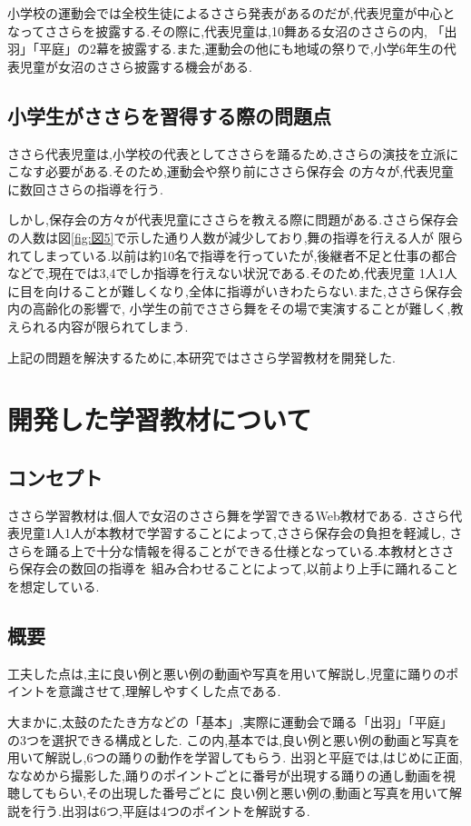 \documentclass[12pt]{ltjsarticle}
\begin{document}
小学校の運動会では全校生徒によるささら発表があるのだが,代表児童が中心となってささらを披露する.その際に,代表児童は,10舞ある女沼のささらの内,
「出羽」「平庭」の2幕を披露する.また,運動会の他にも地域の祭りで,小学6年生の代表児童が女沼のささら披露する機会がある.



\subsection{小学生がささらを習得する際の問題点}
ささら代表児童は,小学校の代表としてささらを踊るため,ささらの演技を立派にこなす必要がある.そのため,運動会や祭り前にささら保存会
の方々が,代表児童に数回ささらの指導を行う.

しかし,保存会の方々が代表児童にささらを教える際に問題がある.ささら保存会の人数は図\ref{fig:図5}で示した通り人数が減少しており,舞の指導を行える人が
限られてしまっている.以前は約10名で指導を行っていたが,後継者不足と仕事の都合などで,現在では3,4でしか指導を行えない状況である.そのため,代表児童
1人1人に目を向けることが難しくなり,全体に指導がいきわたらない.また,ささら保存会内の高齢化の影響で,
小学生の前でささら舞をその場で実演することが難しく,教えられる内容が限られてしまう.

上記の問題を解決するために,本研究ではささら学習教材を開発した.
\newpage
\section{開発した学習教材について}
\subsection{コンセプト}
ささら学習教材は,個人で女沼のささら舞を学習できるWeb教材である.
ささら代表児童1人1人が本教材で学習することによって,ささら保存会の負担を軽減し,
ささらを踊る上で十分な情報を得ることができる仕様となっている.本教材とささら保存会の数回の指導を
組み合わせることによって,以前より上手に踊れることを想定している.

\subsection{概要}
工夫した点は,主に良い例と悪い例の動画や写真を用いて解説し,児童に踊りのポイントを意識させて,理解しやすくした点である.

大まかに,太鼓のたたき方などの「基本」,実際に運動会で踊る「出羽」「平庭」の3つを選択できる構成とした.
この内,基本では,良い例と悪い例の動画と写真を用いて解説し,6つの踊りの動作を学習してもらう.
出羽と平庭では,はじめに正面,ななめから撮影した,踊りのポイントごとに番号が出現する踊りの通し動画を視聴してもらい,その出現した番号ごとに
良い例と悪い例の,動画と写真を用いて解説を行う.出羽は6つ,平庭は4つのポイントを解説する.
\clearpage
\end{document}
